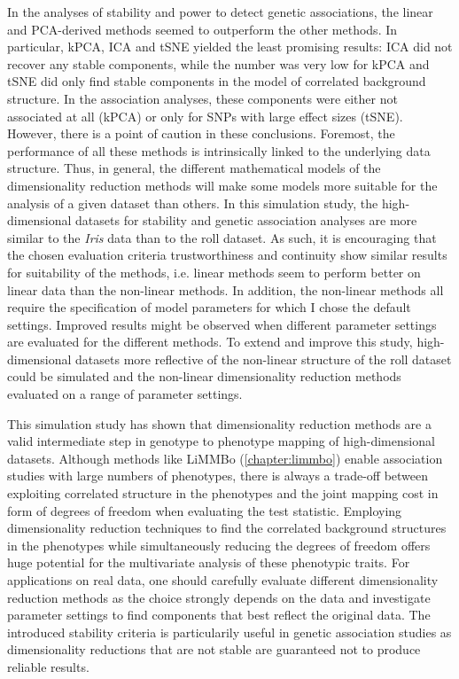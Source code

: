 In the analyses of stability and power to detect genetic associations, the linear and PCA-derived methods seemed to outperform the other methods. In particular, kPCA, ICA and tSNE yielded the least promising results: ICA did not recover any stable components, while the number was very low for kPCA and tSNE did only find stable components in the model of correlated background structure. In the association analyses, these components were either not associated at all (kPCA) or only for SNPs with large effect sizes (tSNE). However, there is a point of caution in these conclusions. Foremost, the performance of all these methods is intrinsically linked to the underlying data structure. Thus, in general, the different mathematical models of the dimensionality reduction methods will make some models more suitable for the analysis of a given dataset than others. In this simulation study, the high-dimensional datasets for stability and genetic association analyses are more similar to the \textit{Iris} data than to the roll dataset. As such, it is encouraging that the chosen evaluation criteria trustworthiness and continuity show similar results for suitability of the methods, i.e. linear methods seem to perform better on linear data than the non-linear methods. In addition, the non-linear methods all require the specification of model parameters for which I chose the default settings. Improved results might be observed when different parameter settings are evaluated for the different methods. To extend and improve this study, high-dimensional datasets more reflective of the non-linear structure of the roll dataset could be simulated and the non-linear dimensionality reduction methods evaluated on a range of parameter settings. 

This simulation study has shown that dimensionality reduction methods are a valid intermediate step in genotype to phenotype mapping of high-dimensional datasets. Although methods like LiMMBo (\cref{chapter:limmbo}) enable association studies with large numbers of phenotypes, there is always a trade-off between exploiting correlated structure in the phenotypes and the joint mapping cost in form of degrees of freedom when evaluating the test statistic. Employing dimensionality reduction techniques to find the correlated background structures in the phenotypes while simultaneously reducing the degrees of freedom offers huge potential for the multivariate analysis of these phenotypic traits. For applications on real data, one should carefully evaluate different dimensionality reduction methods as the choice strongly depends on the data and investigate parameter settings to find components that best reflect the original data. The introduced stability criteria is particularily useful in genetic association studies as dimensionality reductions that are not stable are guaranteed not to produce reliable results.



